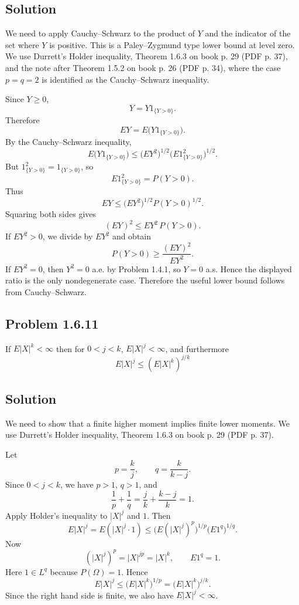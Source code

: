 \documentclass[a4paper,12pt,openany]{article}
\theoremstyle{plain}
\theoremstyle{definition}
\begin{document}
\subsection*{Solution}

We need to apply Cauchy--Schwarz to the product of $Y$ and the indicator of the set where $Y$ is positive. This is a Paley--Zygmund type lower bound at level zero. We use Durrett's Holder inequality, Theorem 1.6.3 on book p. 29 (PDF p. 37), and the note after Theorem 1.5.2 on book p. 26 (PDF p. 34), where the case $p=q=2$ is identified as the Cauchy--Schwarz inequality.

\medskip

Since $Y\ge 0$,
\[
Y=Y1_{\{Y>0\}}.
\]
Therefore
\[
EY
=
E\bigl(Y1_{\{Y>0\}}\bigr).
\]
By the Cauchy--Schwarz inequality,
\[
E\bigl(Y1_{\{Y>0\}}\bigr)
\le
\bigl(EY^2\bigr)^{1/2}
\bigl(E1_{\{Y>0\}}^2\bigr)^{1/2}.
\]
But $1_{\{Y>0\}}^2=1_{\{Y>0\}}$, so
\[
E1_{\{Y>0\}}^2
=
P(Y>0).
\]
Thus
\[
EY
\le
\bigl(EY^2\bigr)^{1/2}P(Y>0)^{1/2}.
\]
Squaring both sides gives
\[
(EY)^2
\le
EY^2\,P(Y>0).
\]
If $EY^2>0$, we divide by $EY^2$ and obtain
\[
P(Y>0)
\ge
\frac{(EY)^2}{EY^2}.
\]
If $EY^2=0$, then $Y^2=0$ a.e. by Problem 1.4.1, so $Y=0$ a.s. Hence the displayed ratio is the only nondegenerate case. Therefore the useful lower bound follows from Cauchy--Schwarz.

\subsection*{Problem 1.6.11}

If $E|X|^k < \infty$ then for $0 < j < k$, $E|X|^j < \infty$, and furthermore
\[
E|X|^j \le (E|X|^k)^{j/k}
\]

\subsection*{Solution}

We need to show that a finite higher moment implies finite lower moments. We use Durrett's Holder inequality, Theorem 1.6.3 on book p. 29 (PDF p. 37).

\medskip

Let
\[
p=\frac{k}{j},
\qquad
q=\frac{k}{k-j}.
\]
Since $0<j<k$, we have $p>1$, $q>1$, and
\[
\frac1p+\frac1q=\frac{j}{k}+\frac{k-j}{k}=1.
\]
Apply Holder's inequality to $|X|^j$ and $1$. Then
\[
E|X|^j
=
E(|X|^j\cdot 1)
\le
\bigl(E(|X|^j)^p\bigr)^{1/p}
\bigl(E1^q\bigr)^{1/q}.
\]
Now
\[
(|X|^j)^p=|X|^{jp}=|X|^k,
\qquad
E1^q=1.
\]
Here $1\in L^q$ because $P(\Omega)=1$.
Hence
\[
E|X|^j
\le
\bigl(E|X|^k\bigr)^{1/p}
=
\bigl(E|X|^k\bigr)^{j/k}.
\]
Since the right hand side is finite, we also have $E|X|^j<\infty$.
\end{document}
